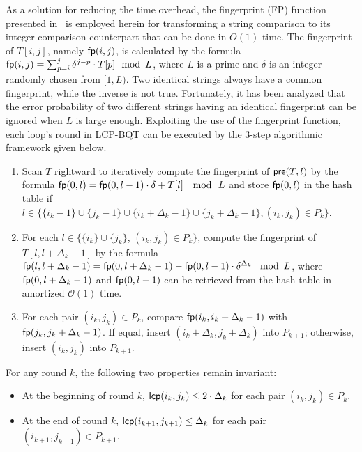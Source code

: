 \documentclass{llncs}
\begin{document}
As a solution for reducing the time overhead, the fingerprint (FP) function presented in~\cite{Karp1987} is employed herein for transforming a string comparison to its integer comparison counterpart that can be done in $O(1)$ time. The fingerprint of $T[i,j]$, namely ${\sf fp}(i,j)$, is calculated by the formula ${\sf fp}(i,j) = \sum_{p=i}^{j} \delta^{j-p} \cdot T[p] \mod \, L$, where $L$ is a prime and $\delta$ is an integer randomly chosen from $[1,L)$. Two identical strings always have a common fingerprint, while the inverse is not true. Fortunately, it has been analyzed that the error probability of two different strings having an identical fingerprint can be ignored when $L$ is large enough. Exploiting the use of the fingerprint function, each loop's round in LCP-BQT can be executed by the 3-step algorithmic framework given below.

\begin{enumerate}
\item Scan $T$ rightward to iteratively compute the fingerprint of ${\sf pre}(T,l)$ by the formula ${\sf fp}(0,l) = {\sf fp}(0, l - 1) \cdot \delta + T[l] \,\, \mod \,\, L$ and store ${\sf fp}(0,l)$ in the hash table if $l\in \{ \{i_k-1\}\cup\{j_k-1\}\cup\{i_k +\Delta_{k} - 1\}\cup\{j_k+ \Delta_{k} - 1\},(i_k,j_k)\in P_k\}$.
\item For each $l\in \{\{i_k\}\cup \{j_k\}$, $(i_k,j_k)\in P_k\}$, compute the fingerprint of $T[l,l+\Delta_{k} - 1]$ by the formula ${\sf fp}(l, l + \Delta_{k} - 1) = {\sf fp}(0,l+ \Delta_{k} - 1) - {\sf fp}(0,l - 1) \cdot \delta^{\Delta_{k}} \, \mod \, L$, where ${\sf fp}(0, l + \Delta_{k} - 1)$ and ${\sf fp}(0, l - 1)$ can be retrieved from the hash table in amortized $\mathcal{O}(1)$ time.
\item For each pair $(i_k,j_k)\in P_k$, compare ${\sf fp}(i_k,i_k+\Delta_{k} - 1)$ with ${\sf fp}(j_k,j_k+\Delta_{k} - 1)$. If equal, insert $(i_k+\Delta_{k},j_k+\Delta_{k})$ into $P_{k+1}$; otherwise, insert $(i_k, j_k)$ into $P_{k+1}$.
\end{enumerate}

For any round $k$, the following two properties remain invariant:

\begin{itemize}
\item At the beginning of round $k$, ${\sf lcp}(i_k,j_k) \le 2 \cdot \Delta_{k}$ for each pair $(i_k,j_k) \in P_k$.
\item At the end of round $k$, ${\sf lcp}(i_{k+1},j_{k+1}) \le \Delta_{k}$ for each pair $(i_{k+1},j_{k+1}) \in P_{k+1}$.
\end{itemize}
\end{document}
